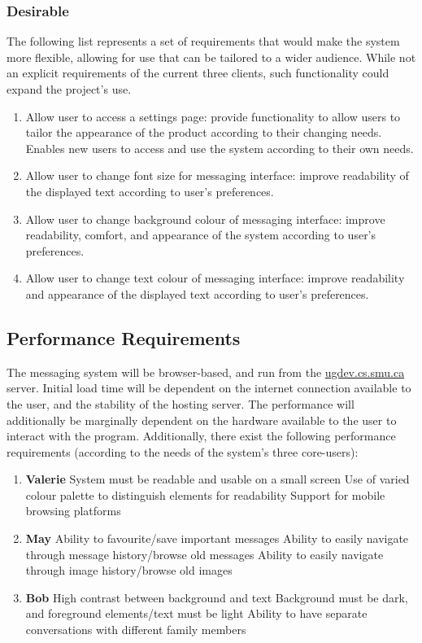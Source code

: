 \documentclass[11pt]{article}
\begin{document}
\subsubsection{Desirable}
The following list represents a set of requirements that would make the system more flexible,
allowing for use that can be tailored to a wider audience. While not an explicit requirements of the
current three clients, such functionality could expand the project's use.
\begin{enumerate}
    \item Allow user to access a settings page: provide functionality to allow users to tailor the
        appearance of the product according to their changing needs. Enables new users to access and
        use the system according to their own needs.
    \item Allow user to change font size for messaging interface: improve readability of the
        displayed text according to user's preferences.
    \item Allow user to change background colour of messaging interface: improve readability,
        comfort, and appearance of the system according to user's preferences.
    \item Allow user to change text colour of messaging interface: improve readability and
        appearance of the displayed text according to user's preferences.
\end{enumerate}

\subsection{Performance Requirements}
The messaging system will be browser-based, and run from the \url{ugdev.cs.smu.ca} server. Initial
load time will be dependent on the internet connection available to the user, and the stability of
the hosting server. The performance will additionally be marginally dependent on the hardware
available to the user to interact with the program. Additionally, there exist the following
performance requirements (according to the needs of the system's three core-users):
\begin{enumerate}[label=\alph*.]
    \item \textbf{Valerie}
        \subitem System must be readable and usable on a small screen
        \subitem Use of varied colour palette to distinguish elements for readability
        \subitem Support for mobile browsing platforms
    \item \textbf{May}
        \subitem Ability to favourite/save important messages
        \subitem Ability to easily navigate through message history/browse old messages
        \subitem Ability to easily navigate through image history/browse old images
    \item \textbf{Bob}
        \subitem High contrast between background and text
        \subitem Background must be dark, and foreground elements/text must be light
        \subitem Ability to have separate conversations with different family members
\end{enumerate}
\end{document}
